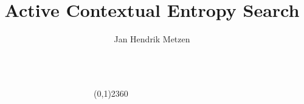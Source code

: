 \documentclass{beamer}
\title{Active Contextual Entropy Search}
\author{Jan Hendrik Metzen}
\newcommand{\maincolor}{red}
\begin{document}
\begin{frame}

\begin{columns}[t]
\begin{column}{.48\textwidth}

\end{column}

\begin{column}{4pt}
\begin{center}
\color{\maincolor}
\linethickness{2pt}
\line(0,1){2360}
\end{center}
\end{column}

\begin{column}{.48\textwidth}

\end{column}
\end{columns}
\end{frame}
\end{document}
